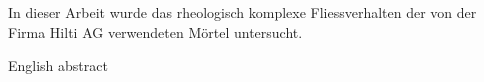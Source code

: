 \thispagestyle{empty}
\begin{abstr}
In dieser Arbeit wurde das rheologisch komplexe Fliessverhalten der von der Firma Hilti AG verwendeten Mörtel untersucht. 
\end{abstr}


\begin{abstr}
English abstract
\end{abstr}

